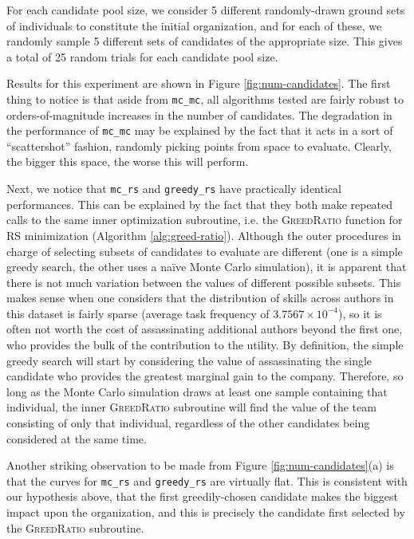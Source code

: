 For each candidate pool size, we consider 5 different randomly-drawn ground sets of individuals to constitute the initial organization, and for each of these, we randomly sample 5 different sets of candidates of the appropriate size.
This gives a total of 25 random trials for each candidate pool size.

Results for this experiment are shown in Figure \ref{fig:num-candidates}.
The first thing to notice is that aside from \texttt{mc\_mc}, all algorithms tested are fairly robust to orders-of-magnitude increases in the number of candidates.
The degradation in the performance of \texttt{mc\_mc} may be explained by the fact that it acts in a sort of ``scattershot'' fashion, randomly picking points from space to evaluate.
Clearly, the bigger this space, the worse this will perform.

Next, we notice that \texttt{mc\_rs} and \texttt{greedy\_rs} have practically identical performances.
This can be explained by the fact that they both make repeated calls to the same inner optimization subroutine, i.e. the \textsc{GreedRatio} function for RS minimization (Algorithm \ref{alg:greed-ratio}).
Although the outer procedures in charge of selecting subsets of candidates to evaluate are different (one is a simple greedy search, the other uses a na\"ive Monte Carlo simulation), it is apparent that there is not much variation between the values of different possible subsets.
This makes sense when one considers that the distribution of skills across authors in this dataset is fairly sparse (average task frequency of $ 3.7567 \times 10^{-4} $), so it is often not worth the cost of assassinating additional authors beyond the first one, who provides the bulk of the contribution to the utility.
By definition, the simple greedy search will start by considering the value of assassinating the single candidate who provides the greatest marginal gain to the company.
Therefore, so long as the Monte Carlo simulation draws at least one sample containing that individual, the inner \textsc{GreedRatio} subroutine will find the value of the team consisting of only that individual, regardless of the other candidates being considered at the same time.

Another striking observation to be made from Figure \ref{fig:num-candidates}(a) is that the curves for \texttt{mc\_rs} and \texttt{greedy\_rs} are virtually flat.
This is consistent with our hypothesis above, that the first greedily-chosen candidate makes the biggest impact upon the organization, and this is precisely the candidate first selected by the \textsc{GreedRatio} subroutine.

